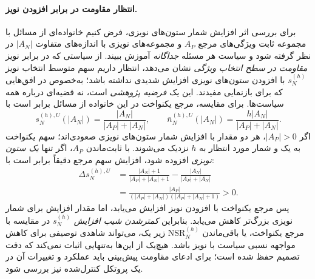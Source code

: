 \paragraph{انتظار مقاومت در برابر افزودن نویز.}
برای بررسی اثر افزایش شمار ستون‌های نویزی،
فرض کنیم خانواده‌ای از مسائل با مجموعه
ثابت ویژگی‌های مرجع $A_P$ و
مجموعه‌های نویزی با اندازه‌های متفاوت
$|A_N|$ در نظر گرفته شود و سیاست هر مسئله
\emph{جداگانه} آموزش ببیند.
از سیاستی که در برابر نویز
\emph{مقاومت در سطح انتخاب ویژگی}
نشان می‌دهد، انتظار داریم
سهم متوسط انتخاب نویز
$s_N^{(h)}$ با افزودن ستون‌های نویزی
افزایش شدیدی نداشته باشد؛
به‌خصوص در افق‌هایی که برای
بازنمایی مفیدند.
این یک \emph{فرضیه پژوهشی} است،
نه قضیه‌ای درباره همه سیاست‌ها.
برای مقایسه، مرجع یکنواخت
در این خانواده از مسائل برابر است با
\begin{equation}\label{eq:ch3-noise-resistance-uniform-growth}
\boxed{
s_N^{(h),U}(|A_N|)
=\frac{|A_N|}{|A_P|+|A_N|},
\qquad
\bar n_N^{(h),U}(|A_N|)
=\frac{h|A_N|}{|A_P|+|A_N|}.
}
\end{equation}
اگر $|A_P|>0$، هر دو مقدار
با افزایش شمار ستون‌های نویزی
صعودی‌اند؛ سهم یکنواخت
به یک و شمار مورد انتظار
به $h$ نزدیک می‌شوند.
با ثابت‌ماندن $A_P$،
اگر تنها \emph{یک ستون نویزی}
افزوده شود، افزایش سهم مرجع
دقیقاً برابر است با:
\begin{equation}\label{eq:ch3-noise-uniform-growth-derivative}
\boxed{
\begin{aligned}
\Delta s_N^{(h),U}
&=\frac{|A_N|+1}{|A_P|+|A_N|+1}
-\frac{|A_N|}{|A_P|+|A_N|}\\
&=\frac{|A_P|}
{(|A_P|+|A_N|)(|A_P|+|A_N|+1)}>0.
\end{aligned}}
\end{equation}
پس مرجع یکنواخت با
افزودن نویز افزایش می‌یابد،
اما مقدار افزایش برای
شمار نویزی بزرگ‌تر کاهش می‌یابد.
بنابراین \emph{کمترشدن شیب افزایش}
$s_N^{(h)}$ در مقایسه با مرجع
یکنواخت، یا باقی‌ماندن
$\mathrm{NSR}_N^{(h)}$ زیر یک،
می‌تواند شاهدی توصیفی برای
کاهش مواجهه نسبی سیاست
با نویز باشد. هیچ‌یک از این‌ها
به‌تنهایی اثبات نمی‌کند که
دقت تصمیم حفظ شده است؛
برای ادعای مقاومت پیش‌بینی
باید عملکرد و تغییرات آن
در یک پروتکل کنترل‌شده نیز
بررسی شود.

